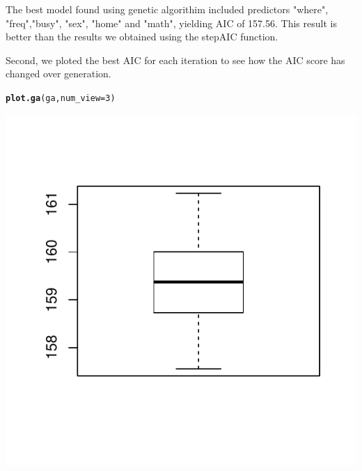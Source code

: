 \documentclass{article}\usepackage[]{graphicx}\usepackage[]{color}
\makeatletter
\def\maxwidth{ %
  \ifdim\Gin@nat@width>\linewidth
    \linewidth
  \else
    \Gin@nat@width
  \fi
}
\newcommand{\hlnum}[1]{\textcolor[rgb]{0.686,0.059,0.569}{#1}}%
\newcommand{\hlstd}[1]{\textcolor[rgb]{0.345,0.345,0.345}{#1}}%
\newcommand{\hlkwc}[1]{\textcolor[rgb]{0.333,0.667,0.333}{#1}}%
\newcommand{\hlkwd}[1]{\textcolor[rgb]{0.737,0.353,0.396}{\textbf{#1}}}%
\newenvironment{kframe}{%
 \def\at@end@of@kframe{}%
 \ifinner\ifhmode%
  \def\at@end@of@kframe{\end{minipage}}%
  \begin{minipage}{\columnwidth}%
 \fi\fi%
 \def\FrameCommand##1{\hskip\@totalleftmargin \hskip-\fboxsep
 \colorbox{shadecolor}{##1}\hskip-\fboxsep
     \hskip-\linewidth \hskip-\@totalleftmargin \hskip\columnwidth}%
 \MakeFramed {\advance\hsize-\width
   \@totalleftmargin\z@ \linewidth\hsize
   \@setminipage}}%
 {\par\unskip\endMakeFramed%
 \at@end@of@kframe}
\newenvironment{knitrout}{}{} %
\makeatother
\begin{document}
The best model found using genetic algorithim included predictors "where",  
"freq","busy", "sex", "home" and "math", yielding AIC of 157.56. This result 
is better than the results we obtained using the stepAIC function. 

Second, we ploted the best AIC for each iteration to see how the AIC score 
has changed over generation. 

\begin{knitrout}
\color{fgcolor}\begin{kframe}
\begin{alltt}
\hlkwd{plot.ga}\hlstd{(ga,} \hlkwc{num_view} \hlstd{=} \hlnum{3}\hlstd{)}
\end{alltt}
\end{kframe}
\includegraphics[width=\maxwidth]{figure/latex-unnamed-chunk-31} 


\end{knitrout}
\end{document}

